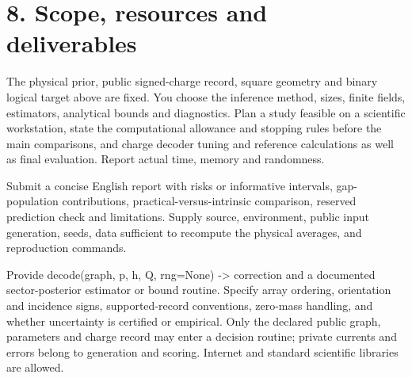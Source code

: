\documentclass[11pt,letterpaper]{article}
\begin{document}
\section*{8. Scope, resources and deliverables}

The physical prior, public signed-charge record, square geometry and binary logical target above are fixed. You choose the inference method, sizes, finite fields, estimators, analytical bounds and diagnostics. Plan a study feasible on a scientific workstation, state the computational allowance and stopping rules before the main comparisons, and charge decoder tuning and reference calculations as well as final evaluation. Report actual time, memory and randomness.\par

Submit a concise English report with risks or informative intervals, gap-population contributions, practical-versus-intrinsic comparison, reserved prediction check and limitations. Supply source, environment, public input generation, seeds, data sufficient to recompute the physical averages, and reproduction commands.\par

Provide {\ttfamily\small decode(\allowbreak{}graph,\allowbreak{} p,\allowbreak{} h,\allowbreak{} Q,\allowbreak{} rng=None) -> correction} and a documented sector-posterior estimator or bound routine. Specify array ordering, orientation and incidence signs, supported-record conventions, zero-mass handling, and whether uncertainty is certified or empirical. Only the declared public graph, parameters and charge record may enter a decision routine; private currents and errors belong to generation and scoring. Internet and standard scientific libraries are allowed.\par
\end{document}
